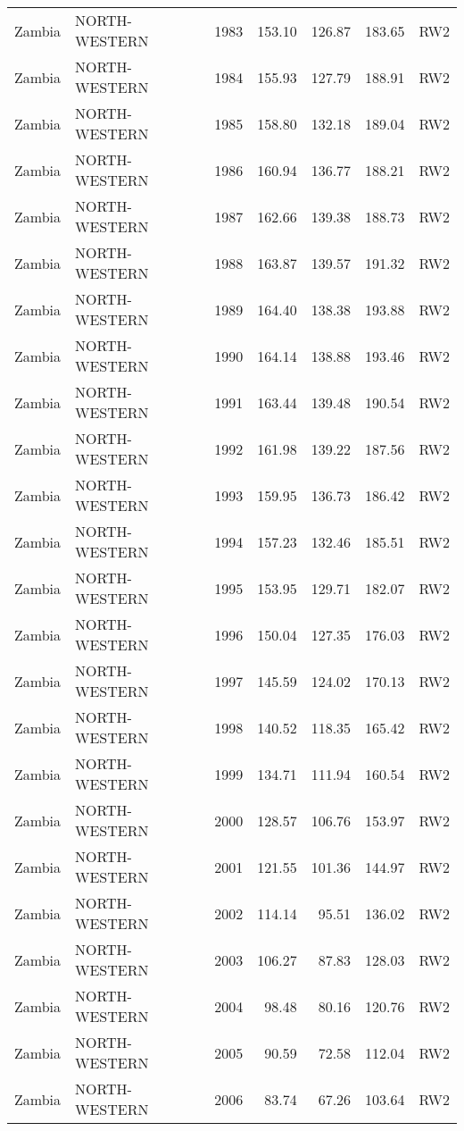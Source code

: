 \begin{longtable}{lllrrrl}
  Zambia & NORTH-WESTERN & 1983 & 153.10 & 126.87 & 183.65 & RW2 \\ 
  Zambia & NORTH-WESTERN & 1984 & 155.93 & 127.79 & 188.91 & RW2 \\ 
  Zambia & NORTH-WESTERN & 1985 & 158.80 & 132.18 & 189.04 & RW2 \\ 
  Zambia & NORTH-WESTERN & 1986 & 160.94 & 136.77 & 188.21 & RW2 \\ 
  Zambia & NORTH-WESTERN & 1987 & 162.66 & 139.38 & 188.73 & RW2 \\ 
  Zambia & NORTH-WESTERN & 1988 & 163.87 & 139.57 & 191.32 & RW2 \\ 
  Zambia & NORTH-WESTERN & 1989 & 164.40 & 138.38 & 193.88 & RW2 \\ 
  Zambia & NORTH-WESTERN & 1990 & 164.14 & 138.88 & 193.46 & RW2 \\ 
  Zambia & NORTH-WESTERN & 1991 & 163.44 & 139.48 & 190.54 & RW2 \\ 
  Zambia & NORTH-WESTERN & 1992 & 161.98 & 139.22 & 187.56 & RW2 \\ 
  Zambia & NORTH-WESTERN & 1993 & 159.95 & 136.73 & 186.42 & RW2 \\ 
  Zambia & NORTH-WESTERN & 1994 & 157.23 & 132.46 & 185.51 & RW2 \\ 
  Zambia & NORTH-WESTERN & 1995 & 153.95 & 129.71 & 182.07 & RW2 \\ 
  Zambia & NORTH-WESTERN & 1996 & 150.04 & 127.35 & 176.03 & RW2 \\ 
  Zambia & NORTH-WESTERN & 1997 & 145.59 & 124.02 & 170.13 & RW2 \\ 
  Zambia & NORTH-WESTERN & 1998 & 140.52 & 118.35 & 165.42 & RW2 \\ 
  Zambia & NORTH-WESTERN & 1999 & 134.71 & 111.94 & 160.54 & RW2 \\ 
  Zambia & NORTH-WESTERN & 2000 & 128.57 & 106.76 & 153.97 & RW2 \\ 
  Zambia & NORTH-WESTERN & 2001 & 121.55 & 101.36 & 144.97 & RW2 \\ 
  Zambia & NORTH-WESTERN & 2002 & 114.14 & 95.51 & 136.02 & RW2 \\ 
  Zambia & NORTH-WESTERN & 2003 & 106.27 & 87.83 & 128.03 & RW2 \\ 
  Zambia & NORTH-WESTERN & 2004 & 98.48 & 80.16 & 120.76 & RW2 \\ 
  Zambia & NORTH-WESTERN & 2005 & 90.59 & 72.58 & 112.04 & RW2 \\ 
  Zambia & NORTH-WESTERN & 2006 & 83.74 & 67.26 & 103.64 & RW2 \\ 

\end{longtable}
